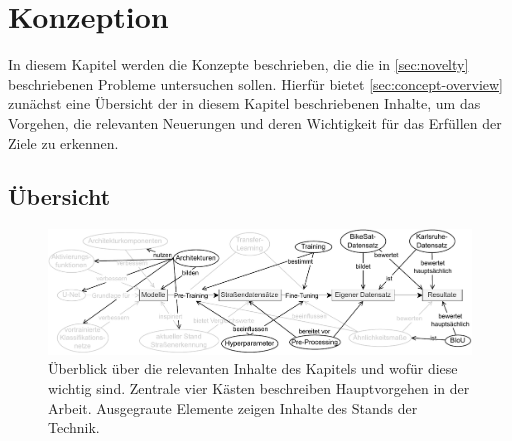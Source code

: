 \chapter{Konzeption} %

In diesem Kapitel werden die Konzepte beschrieben, die die in \autoref{sec:novelty} 
beschriebenen Probleme untersuchen sollen. Hierfür bietet \autoref{sec:concept-overview}
\textit{}
zunächst eine Übersicht der in diesem Kapitel beschriebenen Inhalte, um das Vorgehen, 
die relevanten Neuerungen und deren Wichtigkeit für das Erfüllen der Ziele zu erkennen. 

\section{Übersicht} \label{sec:concept-overview}

\begin{figure}[h]
	\centering
	\includegraphics[width=1.\textwidth]{Bilder/overview.drawio.pdf} 
	\caption{Überblick über die relevanten Inhalte des Kapitels und wofür diese wichtig sind. Zentrale vier Kästen 
	beschreiben Hauptvorgehen in der Arbeit. Ausgegraute Elemente zeigen 
	Inhalte des Stands der Technik.}
	\label{fig:overview-concept}
\end{figure} 


